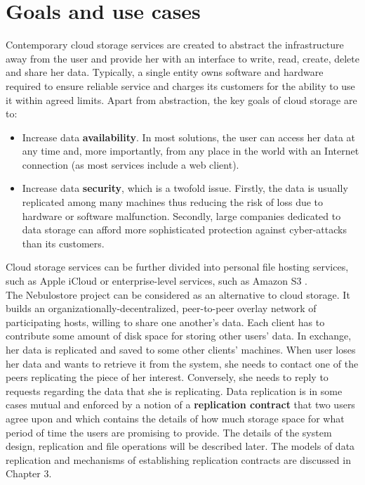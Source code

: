 \documentclass{pracamgren}
\begin{document}
\section{Goals and use cases}

Contemporary cloud storage services are created to abstract the infrastructure away from the user and provide her with an interface to write, read, create, delete and share her data. Typically, a single entity owns software and hardware required to ensure reliable service and charges its customers for the ability to use it within agreed limits. Apart from abstraction, the key goals of cloud storage are to:
\begin{itemize}
\item Increase data {\bf availability}. In most solutions, the user can access her data at any time and, more importantly, from any place in the world with an Internet connection (as most services include a web client).
\item Increase data {\bf security}, which is a twofold issue. Firstly, the data is usually replicated among many machines thus reducing the risk of loss due to hardware or software malfunction. Secondly, large companies dedicated to data storage can afford more sophisticated protection against cyber-attacks than its customers.
\end{itemize}
Cloud storage services can be further divided into personal file hosting services, such as Apple iCloud \cite{icloud} or enterprise-level services, such as Amazon S3 \cite{amazon}.\\

The Nebulostore project can be considered as an alternative to cloud storage. It builds an organizationally-decentralized, peer-to-peer overlay network of participating hosts, willing to share one another's data. Each client has to contribute some amount of disk space for storing other users' data. In exchange, her data is replicated and saved to some other clients' machines. When user loses her data and wants to retrieve it from the system, she needs to contact one of the peers replicating the piece of her interest. Conversely, she needs to reply to requests regarding the data that she is replicating. Data replication is in some cases mutual and enforced by a notion of a {\bf replication contract} that two users agree upon and which contains the details of how much storage space for what period of time the users are promising to provide. The details of the system design, replication and file operations will be described later. The models of data replication and mechanisms of establishing replication contracts are discussed in Chapter 3.\\
\end{document}
